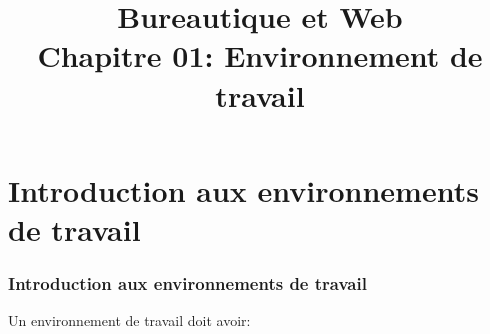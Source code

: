 \documentclass[xcolor=table]{beamer}
\title[BWEB: 01- Environnement] %
{Bureautique et Web \\Chapitre 01: Environnement de travail}
\begin{document}
\begin{frame}[plain]
	\maketitle
\end{frame}

\section{Introduction aux environnements de travail}

\begin{frame}
\frametitle{Introduction aux environnements de travail}

Un environnement de travail doit avoir:


\end{frame}
\end{document}
